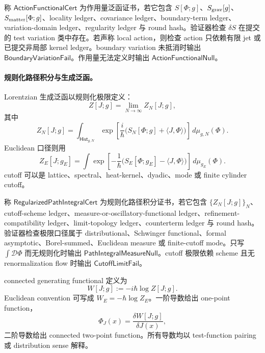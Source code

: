 \begin{definition}[作用量泛函证书]\label{def:typed-address-biaxial-completion-action-functional-cert}
称 \(\mathsf{ActionFunctionalCert}\) 为作用量泛函证书，若它包含 \(S[\Phi;g]\)、\(S_{\rm grav}[g]\)、\(S_{\rm matter}[\Phi;g]\)、locality ledger、covariance ledger、boundary-term ledger、variation-domain ledger、regularity ledger 与 round hash。验证器检查 \(\delta S\) 在提交的 test variation 类中存在。若声称 local action，则检查 action 只依赖有限 jet 或已提交非局部 kernel ledger。boundary variation 未抵消时输出 \(\mathsf{BoundaryVariationFail}\)。作用量无法定义时输出 \(\mathsf{ActionFunctionalNull}\)。
\end{definition}

\paragraph{规则化路径积分与生成泛函。}
Lorentzian 生成泛函以规则化极限定义：
\[
Z[J;g]
=
\lim_{N\to\infty}Z_N[J;g],
\]
其中
\[
Z_N[J;g]
=
\int_{\mathsf{Hist}_{g,N}}
\exp\left[
\frac{i}{\hbar}
\bigl(S_N[\Phi;g]+\langle J,\Phi\rangle\bigr)
\right]\,d\mu_{g,N}(\Phi).
\]
Euclidean 口径则用
\[
Z_E[J;g_E]
=
\int
\exp\left[
-\frac{1}{\hbar}
\bigl(S_E[\Phi;g_E]-\langle J,\Phi\rangle\bigr)
\right]\,d\mu_{g_E}(\Phi).
\]
cutoff 可以是 lattice、spectral、heat-kernel、dyadic、mode 或 finite cylinder cutoff。

\begin{definition}[规则化路径积分证书]\label{def:typed-address-biaxial-completion-regularized-path-integral-cert}
称 \(\mathsf{RegularizedPathIntegralCert}\) 为规则化路径积分证书，若它包含 \(\{Z_N[J;g]\}_N\)、cutoff-scheme ledger、measure-or-oscillatory-functional ledger、refinement-compatibility ledger、limit-topology ledger、counterterm ledger 与 round hash。验证器检查极限口径属于 distributional、Schwinger functional、formal asymptotic、Borel-summed、Euclidean measure 或 finite-cutoff mode。只写 \(\int\mathcal D\Phi\) 而无规则化时输出 \(\mathsf{PathIntegralMeasureNull}\)。cutoff 极限依赖 scheme 且无 renormalization flow 时输出 \(\mathsf{CutoffLimitFail}\)。
\end{definition}

connected generating functional 定义为
\[
\boxed{
W[J;g]:=-i\hbar\log Z[J;g].
}
\]
Euclidean convention 可写成 \(W_E=-\hbar\log Z_E\)。一阶导数给出 one-point function，
\[
\Phi_J(x)=\frac{\delta W[J;g]}{\delta J(x)},
\]
二阶导数给出 connected two-point function。所有导数均以 test-function pairing 或 distribution sense 解释。

